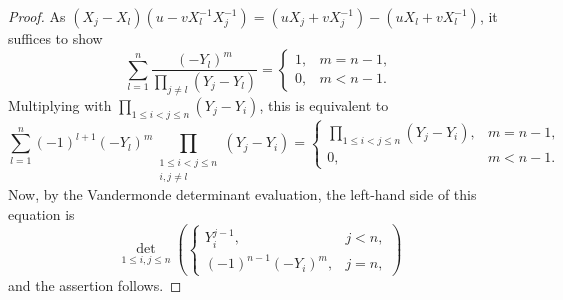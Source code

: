 \documentclass[12pt]{amsart}
\theoremstyle{definition}
\numberwithin{equation}{section}
\begin{document}
	\begin{proof} As $(X_j-X_l)(u-v X_l^{-1} X_j^{-1}) = (u X_j + v X_j^{-1}) - (u X_l + v X_l^{-1})$, it suffices to show 
		\begin{equation*}
		\sum_{l=1}^n  \frac{(-Y_l)^{m}}{\prod_{j \not= l} (Y_j-Y_l)} =  
		\begin{cases}1, & m=n-1,\\0, & m<n-1. \end{cases}
		\end{equation*}
		Multiplying with $\prod_{1 \le i < j \le n} (Y_j-Y_i)$, this is equivalent to
		\begin{equation*}
		\sum_{l=1}^n  (-1)^{l+1} (-Y_l)^{m} \prod_{\substack{1 \le i < j \le n \\ i,j \not=l}} (Y_j-Y_i)  =  
		\begin{cases} \prod_{1 \le i < j \le n} (Y_j-Y_i),& m=n-1,\\0, & m<n-1. \end{cases}
		\end{equation*}
		Now, by the Vandermonde determinant evaluation, the left-hand side of this equation is 
		\begin{equation*}
		\det_{1 \le i,j \le n} \left( \begin{cases} Y_i^{j-1}, & j<n, \\  (-1)^{n-1} (-Y_i)^m, & j=n, \end{cases} \right)
		\end{equation*}
		and the assertion follows.
	\end{proof} 
	
\end{document}
